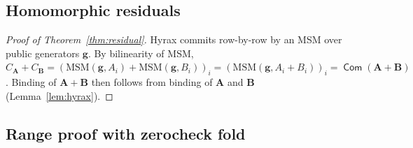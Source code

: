 \documentclass[letterpaper,twocolumn,10pt]{article}
\theoremstyle{remark}
\theoremstyle{definition}
\newcommand{\bA}{\mathbf{A}}
\newcommand{\bB}{\mathbf{B}}
\DeclareMathOperator{\Com}{\mathsf{Com}}
\begin{document}
\subsection{Homomorphic residuals}
\begin{proof}[Proof of Theorem~\ref{thm:residual}]
Hyrax commits row-by-row by an MSM over public generators $\mathbf g$.
By bilinearity of MSM,
$C_\bA\!+\!C_\bB\!=\!(\mathrm{MSM}(\mathbf g,A_i)+\mathrm{MSM}(\mathbf g,B_i))_i\!=\!(\mathrm{MSM}(\mathbf g,A_i\!+\!B_i))_i\!=\!\Com(\bA\!+\!\bB)$.
Binding of $\bA\!+\!\bB$ then follows from binding of $\bA$ and $\bB$
(Lemma~\ref{lem:hyrax}).
\end{proof}

\subsection{Range proof with zerocheck fold}
\end{document}
